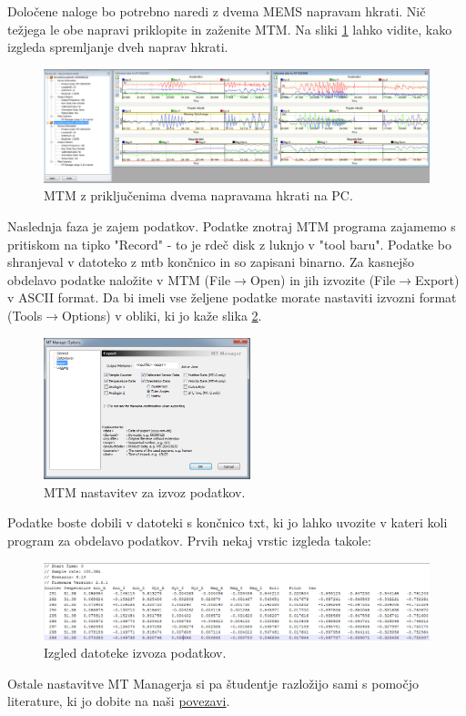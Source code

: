 Določene naloge bo potrebno naredi z dvema MEMS napravam hkrati. Nič težjega le obe napravi priklopite in zaženite MTM. Na sliki \ref{fig:v_mems_double} lahko vidite, kako izgleda spremljanje dveh naprav hkrati.

\begin{figure}[!h]
	\centering \includegraphics[width=12cm]{Vaje/ManevrZMems/figs/mtm_double.png}
	\caption{MTM z priključenima dvema napravama hkrati na PC.}
	\label{fig:v_mems_double}
\end{figure}

Naslednja faza je zajem podatkov. Podatke znotraj MTM programa zajamemo s pritiskom na tipko "Record" - to je rdeč disk z luknjo v "tool baru". Podatke bo shranjeval v datoteko z mtb končnico in so zapisani binarno. Za kasnejšo obdelavo podatke naložite v MTM (File$\to$Open) in jih izvozite (File$\to$Export) v ASCII format. Da bi imeli vse željene podatke morate nastaviti izvozni format (Tools$\to$Options) v obliki, ki jo kaže slika \ref{fig:v_mems_export}.

\begin{figure}[!h]
	\centering \includegraphics[width=6cm]{Vaje/ManevrZMems/figs/mtm_export.png}
	\caption{MTM nastavitev za izvoz podatkov.}
	\label{fig:v_mems_export}
\end{figure}

\newpage
Podatke boste dobili v datoteki s končnico txt, ki jo lahko uvozite v kateri koli program za obdelavo podatkov. Prvih nekaj vrstic izgleda takole:

\begin{figure}[!h]
	\centering \includegraphics[width=12cm]{Vaje/ManevrZMems/figs/mtm_e_ascii.png}
	\caption{Izgled datoteke izvoza podatkov.}
	\label{fig:v_mems_e_ascii}
\end{figure}
\noindent
Ostale nastavitve MT Managerja si pa študentje razložijo sami s pomočjo literature, ki jo dobite na naši \href{https://drive.google.com/drive/folders/0B1dT-CBA07ANLWdYVHlVd3p1Q0U}{povezavi}.

